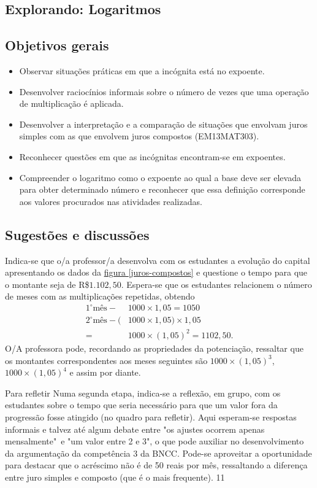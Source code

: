 \def\currentcolor{session1}
\begin{texto}
{
\section{Explorando: Logaritmos}
\subsection{Objetivos gerais}
\begin{itemize}
\item Observar situações práticas em que a incógnita está no expoente.
\item Desenvolver raciocínios informais sobre o número de vezes que uma operação de multiplicação é aplicada.
\item Desenvolver a interpretação e a comparação de situações que envolvam juros simples com as que envolvem juros compostos (EM13MAT303).
\item Reconhecer questões em que as incógnitas encontram-se em expoentes.
\item Compreender o logaritmo como o expoente ao qual a base deve ser elevada para obter determinado número e reconhecer que essa definição corresponde aos valores procurados nas atividades realizadas.
\end{itemize}

\subsection{Sugestões e discussões}

Indica-se que o/a professor/a desenvolva com os estudantes a evolução  do capital apresentando os dados da \hyperref[juros-compostos]{figura \ref{juros-compostos}} e questione o tempo para que o montante seja de R\$$1.102{,}50$. Espera-se que os estudantes relacionem o número de meses com as multiplicações repetidas, obtendo
\begin{align*} 
1^{\circ} \mbox{m\^es} - &1000 \times 1,05 = 1050\\
2^{\circ} \mbox{m\^es} - (&1000 \times 1,05) \times 1,05\\
 = &1000 \times (1,05)^2 = 1102,50.
\end{align*}
O/A professora pode, recordando as propriedades da potenciação, ressaltar que os montantes correspondentes aos meses seguintes são 
$1000 \times (1,05)^3$, $1000 \times (1,05)^4$ e assim por diante.
}
\end{texto}
\begin{sugestions}{Para refletir}
{
	Numa segunda etapa, indica-se a reflexão, em grupo, com os estudantes sobre o tempo que seria necessário para que um valor fora da progressão fosse atingido (no quadro para refletir). Aqui esperam-se respostas informais e talvez até algum debate entre "os ajustes ocorrem apenas mensalmente"\, e "um valor entre 2 e 3", o que pode auxiliar no desenvolvimento da argumentação da competência 3 da BNCC. Pode-se aproveitar a oportunidade para destacar que o acréscimo não é de 50 reais por mês, ressaltando a diferença entre juro simples e composto (que é o mais frequente).
}{1}{1}
\end{sugestions}
